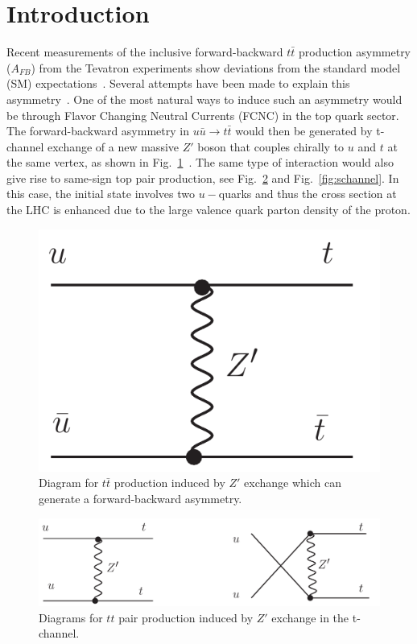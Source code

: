 \section{Introduction}
\label{sec:intro}

Recent measurements of the inclusive forward-backward $t\bar{t}$ production 
asymmetry ($A_{FB}$) from the 
Tevatron experiments show deviations from the standard model 
(SM) expectations~\cite{d0:fwtop, cdf:fwtop1, cdf:fwtop2}.
Several attempts have been made to explain this asymmetry~\cite{berger, Buckley, Gresham, zoltan}. 
One of the most natural ways to induce such an asymmetry would be through
Flavor Changing Neutral Currents (FCNC) in the top quark sector. 
The forward-backward asymmetry in $u\bar{u} \to t\bar{t}$ would then be generated
by t-channel exchange of a new massive $Z'$ boson that couples chirally to
$u$ and $t$ at the same vertex, as shown in Fig.~\ref{fig:ttbar}~\cite{berger}.
The same type of interaction would also give rise to same-sign top pair production, 
see Fig.~\ref{fig:tchannel} and Fig.~\ref{fig:schannel}. 
In this case, the initial state involves two $u-$quarks and 
thus the cross section at the LHC is enhanced due 
to the large valence quark parton density of the proton. 

\begin{figure}[htb]
\begin{center}
\includegraphics[width=0.35\linewidth, height=0.25\linewidth]{figs/ttbar_Z.pdf}
\caption{ Diagram for $t\bar{t}$ production induced by $Z'$ exchange which
can generate a forward-backward asymmetry. \label{fig:ttbar}}
\end{center}
\end{figure}

\begin{figure}[htb]
\begin{center}
\includegraphics[width=0.7\linewidth, height=0.2\linewidth]{figs/sstop1.pdf}
\caption{ Diagrams for $tt$ pair production induced by $Z'$ exchange in the t-channel. 
\label{fig:tchannel}}
\end{center}
\end{figure}

